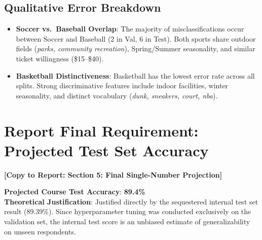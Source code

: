 \documentclass[11pt,a4paper]{article}
\newcommand{\reporttag}[1]{%
  \vspace{0.4em}\noindent\colorbox{tagblue!10}{\textbf{\textcolor{tagblue}{[Copy to Report: #1]}}}\vspace{0.2em}%
}
\begin{document}
\subsection{Qualitative Error Breakdown}
\begin{itemize}
    \item \textbf{Soccer vs.\ Baseball Overlap}: The majority of misclassifications occur between Soccer and Baseball (2 in Val, 6 in Test). Both sports share outdoor fields (\textit{parks, community recreation}), Spring/Summer seasonality, and similar ticket willingness (\$15--\$40).
    \item \textbf{Basketball Distinctiveness}: Basketball has the lowest error rate across all splits. Strong discriminative features include indoor facilities, winter seasonality, and distinct vocabulary (\textit{dunk, sneakers, court, nba}).
\end{itemize}

\section{Report Final Requirement: Projected Test Set Accuracy}
\reporttag{Section 5: Final Single-Number Projection}

\noindent\textbf{Projected Course Test Accuracy}: \textbf{89.4\%} \\
\textbf{Theoretical Justification}: Justified directly by the sequestered internal test set result (89.39\%). Since hyperparameter tuning was conducted exclusively on the validation set, the internal test score is an unbiased estimate of generalizability on unseen respondents.
\end{document}
